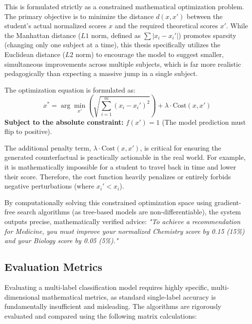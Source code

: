 This is formulated strictly as a constrained mathematical optimization problem. The primary objective is to minimize the distance $d(x, x')$ between the student's actual normalized scores $x$ and the required theoretical scores $x'$. While the Manhattan distance ($L1$ norm, defined as $\sum |x_i - x_i'|$) promotes sparsity (changing only one subject at a time), this thesis specifically utilizes the Euclidean distance ($L2$ norm) to encourage the model to suggest smaller, simultaneous improvements across multiple subjects, which is far more realistic pedagogically than expecting a massive jump in a single subject.

The optimization equation is formulated as:
\[
x^* = \arg\min_{x'} \left( \sqrt{\sum_{i=1}^{m} (x_i - x_i')^2} \right) + \lambda \cdot \text{Cost}(x, x')
\]
\textbf{Subject to the absolute constraint:} $f(x') = 1$ (The model prediction must flip to positive).

The additional penalty term, $\lambda \cdot \text{Cost}(x, x')$, is critical for ensuring the generated counterfactual \parencite{wachter2017counterfactual} is practically actionable in the real world. For example, it is mathematically impossible for a student to travel back in time and lower their score. Therefore, the cost function heavily penalizes or entirely forbids negative perturbations (where $x_i' < x_i$). 

By computationally solving this constrained optimization space using gradient-free search algorithms (as tree-based models are non-differentiable), the system outputs precise, mathematically verified advice: \textit{"To achieve a recommendation for Medicine, you must improve your normalized Chemistry score by 0.15 (15\%) and your Biology score by 0.05 (5\%)."}

\subsection{Evaluation Metrics}

Evaluating a multi-label \parencite{tsoumakas2007multi} classification model requires highly specific, multi-dimensional mathematical metrics, as standard single-label accuracy is fundamentally insufficient and misleading. The algorithms are rigorously evaluated and compared using the following matrix calculations:

